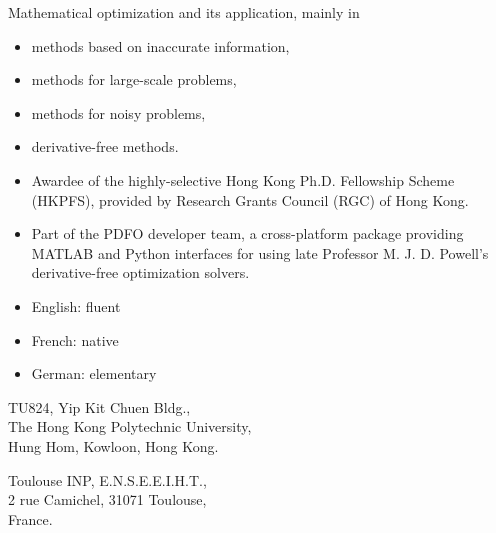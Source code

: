 Mathematical optimization and its application, mainly in
\begin{itemize}
    \item methods based on inaccurate information,
    \item methods for large-scale problems,
    \item methods for noisy problems,
    \item derivative-free methods.
\end{itemize}


\cvtag{\LaTeX}


\begin{itemize}
    \item Awardee of the highly-selective Hong Kong Ph.D. Fellowship Scheme (HKPFS), provided by Research Grants Council (RGC) of Hong Kong.
    \item Part of the PDFO developer team, a cross-platform package providing MATLAB and Python interfaces for using late Professor M. J. D. Powell's derivative-free optimization solvers.
\end{itemize}


\begin{itemize}
    \item English: fluent
    \item French: native
    \item German: elementary
\end{itemize}


{TU824, Yip Kit Chuen Bldg., \\The Hong Kong Polytechnic University, \\ Hung Hom, Kowloon, Hong Kong.}

\divider

{Toulouse INP, E.N.S.E.E.I.H.T.,\\ 2 rue Camichel, 31071 Toulouse, \\France.}
